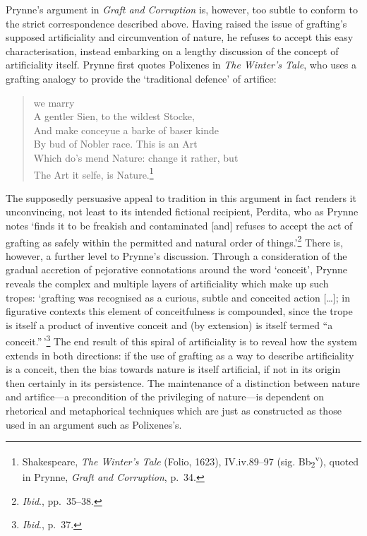 \documentclass[]{article}
\begin{document}
Prynne's argument in \emph{Graft and Corruption} is, however, too subtle
to conform to the strict correspondence described above. Having raised
the issue of grafting's supposed artificiality and circumvention of
nature, he refuses to accept this easy characterisation, instead
embarking on a lengthy discussion of the concept of artificiality
itself. Prynne first quotes Polixenes in \emph{The Winter's Tale}, who
uses a grafting analogy to provide the `traditional defence' of
artifice:

\begin{quote}
we marry\\
A gentler Sien, to the wildest Stocke,\\
And make conceyue a barke of baser kinde\\
By bud of Nobler race. This is an Art\\
Which do's mend Nature: change it rather, but\\
The Art it selfe, is Nature.\footnote{Shakespeare, \emph{The Winter's
  Tale} (Folio, 1623), IV.iv.89--97 (sig.
  Bb\textsubscript{2}\textsuperscript{v}), quoted in Prynne, \emph{Graft
  and Corruption}, p.~34.}
\end{quote}

\noindent The supposedly persuasive appeal to tradition in this argument
in fact renders it unconvincing, not least to its intended fictional
recipient, Perdita, who as Prynne notes `finds it to be freakish and
contaminated {[}and{]} refuses to accept the act of grafting as safely
within the permitted and natural order of things.'\footnote{\emph{Ibid}.,
  pp.~35--38.} There is, however, a further level to Prynne's
discussion. Through a consideration of the gradual accretion of
pejorative connotations around the word `conceit', Prynne reveals the
complex and multiple layers of artificiality which make up such tropes:
`grafting was recognised as a curious, subtle and conceited action
{[}\ldots{}{]}; in figurative contexts this element of conceitfulness is
compounded, since the trope is itself a product of inventive conceit and
(by extension) is itself termed ``a conceit.''\,'\footnote{\emph{Ibid}.,
  p.~37.} The end result of this spiral of artificiality is to reveal
how the system extends in both directions: if the use of grafting as a
way to describe artificiality is a conceit, then the bias towards nature
is itself artificial, if not in its origin then certainly in its
persistence. The maintenance of a distinction between nature and
artifice---a precondition of the privileging of nature---is dependent on
rhetorical and metaphorical techniques which are just as constructed as
those used in an argument such as Polixenes's.
\end{document}
